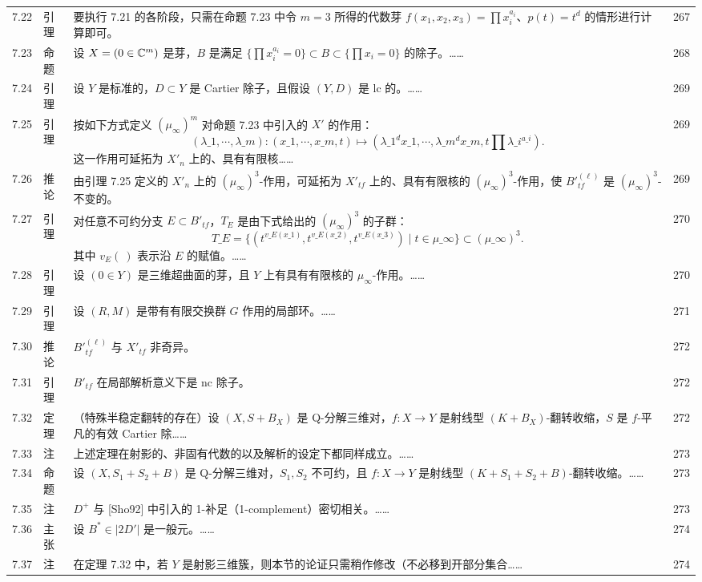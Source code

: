 \begin{longtable}{@{}p{}p{}p{}p{}@{}}
7.22 & 引理 & 要执行 7.21 的各阶段，只需在命题 7.23 中令 $m=3$ 所得的代数芽 $f(x_1,x_2,x_3)=\prod x_i^{a_i}$、$p(t)=t^d$ 的情形进行计算即可。 & 267 \\
7.23 & 命题 & 设 $X=(0\in\mathbb{C}^m)$ 是芽，$B$ 是满足 $\{\prod x_i^{a_i}=0\}\subset B\subset\{\prod x_i=0\}$ 的除子。…… & 268 \\
7.24 & 引理 & 设 $Y$ 是标准的，$D\subset Y$ 是 Cartier 除子，且假设 $(Y,D)$ 是 lc 的。…… & 269 \\
7.25 & 引理 & 按如下方式定义 $(\mu_\infty)^m$ 对命题 7.23 中引入的 $X'$ 的作用： \[ (\lambda\_1,\cdots,\lambda\_m)\colon(x\_1,\cdots,x\_m,t)\mapsto(\lambda\_1^dx\_1,\cdots,\lambda\_m^dx\_m,t\prod\lambda\_i^{a\_i}). \] 这一作用可延拓为 $X'_n$ 上的、具有有限核…… & 269 \\
7.26 & 推论 & 由引理 7.25 定义的 $X'_n$ 上的 $(\mu_\infty)^3$-作用，可延拓为 $X'_{tf}$ 上的、具有有限核的 $(\mu_\infty)^3$-作用，使 $B'^{(\ell)}_{tf}$ 是 $(\mu_\infty)^3$-不变的。 & 269 \\
7.27 & 引理 & 对任意不可约分支 $E\subset B'_{tf}$，$T_E$ 是由下式给出的 $(\mu_\infty)^3$ 的子群： \[ T\_E=\{(t^{v\_E(x\_1)},t^{v\_E(x\_2)},t^{v\_E(x\_3)})\mid t\in\mu\_\infty\}\subset(\mu\_\infty)^3. \] 其中 $v_E(\ )$ 表示沿 $E$ 的赋值。…… & 270 \\
7.28 & 引理 & 设 $(0\in Y)$ 是三维超曲面的芽，且 $Y$ 上有具有有限核的 $\mu_\infty$-作用。…… & 270 \\
7.29 & 引理 & 设 $(R,M)$ 是带有有限交换群 $G$ 作用的局部环。…… & 271 \\
7.30 & 推论 & $B'^{(\ell)}_{tf}$ 与 $X'_{tf}$ 非奇异。 & 272 \\
7.31 & 引理 & $B'_{tf}$ 在局部解析意义下是 nc 除子。 & 272 \\
7.32 & 定理 & （特殊半稳定翻转的存在）设 $(X,S+B_X)$ 是 Q-分解三维对，$f\colon X\to Y$ 是射线型 $(K+B_X)$-翻转收缩，$S$ 是 $f$-平凡的有效 Cartier 除…… & 272 \\
7.33 & 注 & 上述定理在射影的、非固有代数的以及解析的设定下都同样成立。…… & 273 \\
7.34 & 命题 & 设 $(X,S_1+S_2+B)$ 是 Q-分解三维对，$S_1,S_2$ 不可约，且 $f\colon X\to Y$ 是射线型 $(K+S_1+S_2+B)$-翻转收缩。…… & 273 \\
7.35 & 注 & $D^+$ 与 [Sho92] 中引入的 1-补足（1-complement）密切相关。…… & 273 \\
7.36 & 主张 & 设 $B^*\in|2D'|$ 是一般元。…… & 274 \\
7.37 & 注 & 在定理 7.32 中，若 $Y$ 是射影三维簇，则本节的论证只需稍作修改（不必移到开部分集合…… & 274 \\

\end{longtable}
